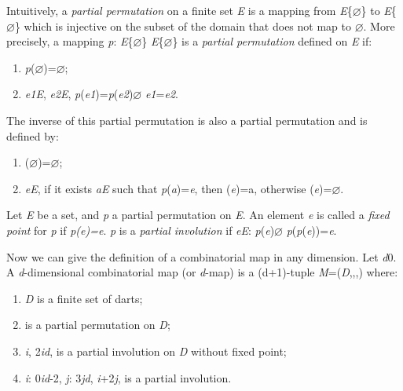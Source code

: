 Intuitively, a \emph{partial permutation} on a finite set \emph{E} is a
mapping from \emph{E}\mycup{}\{$\varnothing$\} to \emph{E}\mycup{}\{$\varnothing$\} which is
injective on the subset of the domain that does not map to
$\varnothing$.  More precisely, a mapping \emph{p}: \emph{E}\mycup{}\{$\varnothing$\}
\myrightarrow{} \emph{E}\mycup{}\{$\varnothing$\} is a \emph{partial permutation}
defined on \emph{E} if:
\begin{enumerate}
\item \emph{p}($\varnothing$)=$\varnothing$;
\item \myforall{}\emph{e1}\myin{}\emph{E}, \myforall{}\emph{e2}\myin{}\emph{E},
  \emph{p}(\emph{e1})=\emph{p}(\emph{e2})\myneq{}$\varnothing$ \myRightarrow{} \emph{e1}=\emph{e2}.
\end{enumerate}

The inverse \pinv{} of this partial permutation is also a partial
permutation and is defined by:
\begin{enumerate}
\item \pinv{}($\varnothing$)=$\varnothing$;
\item \myforall{}\emph{e}\myin{}\emph{E}, if it exists \emph{a}\myin{}\emph{E} such that 
  \emph{p}(\emph{a})=\emph{e},
  then \pinv{}(\emph{e})=a, otherwise \pinv{}(\emph{e})=$\varnothing$.
\end{enumerate}

Let \emph{E} be a set, and \emph{p} a partial permutation on \emph{E}.  An element
\emph{e} is called a \emph{fixed point} for \emph{p} if \emph{p(e)=e}.  \emph{p} is a
\emph{partial involution} if \myforall{}\emph{e}\myin{}\emph{E}: \emph{p}(\emph{e})\myneq{}$\varnothing$
\myRightarrow{} \emph{p}(\emph{p}(\emph{e}))=\emph{e}.

Now we can give the definition of a combinatorial map in any dimension.
Let \emph{d}\mygeq{}0. A \emph{d}-dimensional combinatorial map (or 
\emph{d}-map) is a (d+1)-tuple \emph{M}=(\emph{D},\betaun{},\myldots{},\betad{}) 
where:
\begin{enumerate}
\item \emph{D} is a finite set of darts;
\item \betaun{} is a partial permutation on \emph{D};
\item \myforall{}\emph{i}, 2\myleq{}\emph{i}\myleq{}\emph{d}, \betai{} is a
  partial involution on \emph{D} without fixed point;
\item\label{cond-composition} \myforall{}\emph{i}: 0\myleq{}\emph{i}\myleq{}\emph{d}-2,
  \myforall{}\emph{j}: 3\myleq{}\emph{j}\myleq{}\emph{d}, \emph{i}+2\myleq{}\emph{j},
  \betai{}\comp{}\betaj{} is a partial involution.
\end{enumerate}

